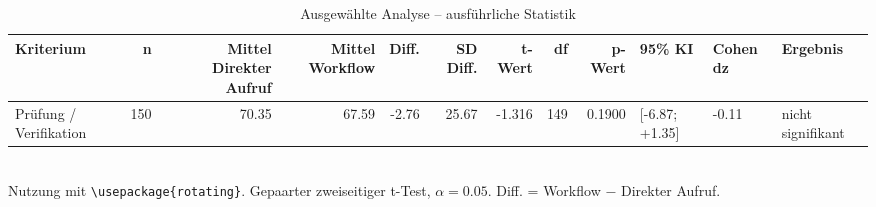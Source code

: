 \begin{table}
\centering
\caption{Ausgewählte Analyse -- ausführliche Statistik}
\begin{tabular}{lrrrrrrrrlll}
\toprule
Kriterium & n & Mittel Direkter Aufruf & Mittel Workflow & Diff. & SD Diff. & t-Wert & df & p-Wert & 95\% KI & Cohen dz & Ergebnis \\
\midrule
Prüfung / Verifikation & 150 & 70.35 & 67.59 & -2.76 & 25.67 & -1.316 & 149 & 0.1900 & [-6.87; +1.35] & -0.11 & nicht signifikant \\
\bottomrule
\end{tabular}
\\[2mm]
\footnotesize Nutzung mit \texttt{\textbackslash usepackage\{rotating\}}. Gepaarter zweiseitiger t-Test, $\alpha=0.05$. Diff. = Workflow $-$ Direkter Aufruf.
\end{table}

